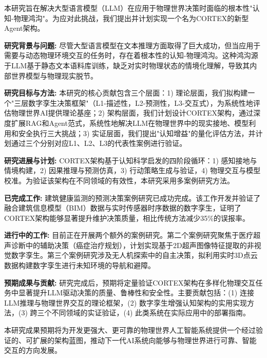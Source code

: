 
本研究旨在解决大型语言模型（LLM）在应用于物理世界决策时面临的根本性"认知-物理鸿沟"。为应对此挑战，我们提出并计划实现一个名为CORTEX的新型Agent架构。

\textbf{研究背景与问题:} 尽管大型语言模型在文本推理方面取得了巨大成功，但当应用于需要与动态物理环境交互的任务时，存在着根本性的认知-物理鸿沟。这种鸿沟源于LLM基于静态文本语料库训练，缺乏对实时物理状态的情境化理解，导致其内部世界模型与物理现实脱节。

\textbf{研究目标与方法:} 本研究的核心贡献包含三个层面：1) 理论层面，我们拟构建一个"三层数字孪生决策框架"（L1-描述性，L2-预测性，L3-交互式），为系统性地评估物理世界AI提供理论基座；2) 架构层面，我们计划设计CORTEX架构，通过深度扩展RAG和Agent范式，系统性地解决LLM在物理世界中的现实接地、模型利用和安全执行三大挑战；3) 实证层面，我们提出"认知增益"的量化评估方法，并计划通过三个分别对应L1、L2、L3的代表性案例进行验证。

\textbf{研究进展与计划:} CORTEX架构基于认知科学启发的四阶段循环：1) 感知接地与情境构建，2) 因果推理与预测仿真，3) 行动策略生成与验证，4) 物理交互与模型校准。为验证该架构在不同领域的有效性，本研究采用多案例研究方法。

\textbf{已完成工作:} 建筑健康监测的预测决策案例研究已成功完成。该工作开发并验证了融合建筑信息模型（BIM）数据与实时传感器时序数据的数字孪生，证明了CORTEX架构能够显著提升维护决策质量，相比传统方法减少35\%的误报率。

\textbf{进行中的工作:} 目前正在开展两个额外的案例研究。第二个案例研究聚焦于医疗超声诊断中的辅助决策（癌症治疗规划），计划实现基于2D超声图像特征提取的非视觉数字孪生。第三个案例研究涉及无人机探索中的自主决策，拟利用实时3D点云数据构建数字孪生进行未知环境的导航和避障。

\textbf{预期成果与贡献:} 研究完成后，预期将定量验证CORTEX架构在多样化物理交互任务中显著提升LLM驱动决策的质量、鲁棒性和安全性。主要贡献包括：(1) 连接LLM推理与物理世界交互的理论框架，(2) 数字孪生增强认知架构的实用实现方法，(3) 跨三个不同领域的实证验证，(4) 此类系统在实际应用中的部署指南。

本研究成果预期将为开发更强大、更可靠的物理世界人工智能系统提供一个经过验证的、可扩展的架构蓝图，推动下一代AI系统向能够与物理世界进行可靠、智能交互的方向发展。